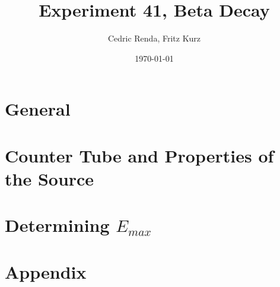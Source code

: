 \documentclass[12pt,a4paper]{article}
\title{Experiment 41, Beta Decay}
\author{Cedric Renda, Fritz Kurz}
\date{\today}
\begin{document}
\maketitle




\tableofcontents
\section{General}



\section{Counter Tube and Properties of the Source}





\section{Determining $E_{max}$}






%

\newpage

\section{Appendix}


\end{document}
